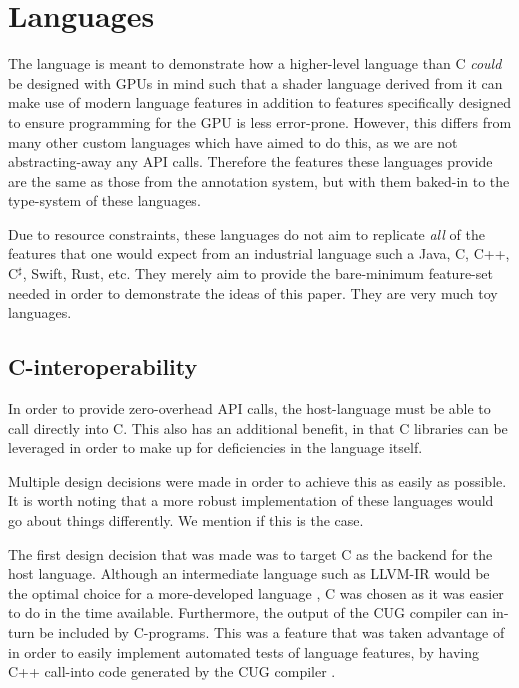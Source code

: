 \documentclass[a4paper,12pt,twoside,openright]{report}
\begin{document}

\section{Languages}

\label{sec:design_languages}

The language is meant to demonstrate how a higher-level language than C
\textit{could} be designed with GPUs in mind such that a shader language
derived from it can make use of modern language features in addition to
features specifically designed to ensure programming for the GPU is less
error-prone. However, this differs from many other custom languages which have
aimed to do this, as we are not abstracting-away any API calls. Therefore the
features these languages provide are the same as those from the annotation
system, but with them baked-in to the type-system of these languages.

Due to resource constraints, these languages do not aim to replicate
\textit{all} of the features that one would expect from an industrial language
such a Java, C, C++, C$^\sharp$, Swift, Rust, etc. They merely aim to provide
the bare-minimum feature-set needed in order to demonstrate the ideas of this
paper. They are very much toy languages.

\subsection{C-interoperability}

In order to provide zero-overhead API calls, the host-language must be able to
call directly into C. This also has an additional benefit, in that C libraries
can be leveraged in order to make up for deficiencies in the language itself.

Multiple design decisions were made in order to achieve this as easily as
possible. It is worth noting that a more robust implementation of these
languages would go about things differently. We mention if this is the case.

The first design decision that was made was to target C as the backend for the
host language. Although an intermediate language such as LLVM-IR would be the
optimal choice for a more-developed language \cite{TODO}, C was chosen as it
was easier to do in the time available. Furthermore, the output of the CUG compiler
can in-turn be included by C-programs. This was a feature that was taken
advantage of in order to easily implement automated tests of language features,
by having C++ call-into code generated by the CUG compiler \cite{AutomatedTestCode}
\cite{AutomatedTestOutput}.
\end{document}
